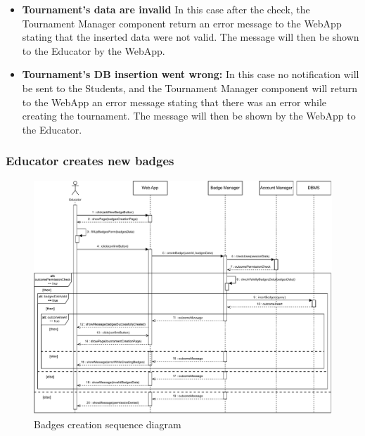 \documentclass{article}
\begin{document}
{\begin{itemize}
            \item \textbf{Tournament's data are invalid} In this case after the check, the 
            Tournament Manager component return an error message to the WebApp stating 
            that the inserted data were not valid. The message will then be shown to the 
            Educator by the WebApp.
            \item \textbf{Tournament's DB insertion went wrong:} In this case no 
            notification will be sent to the Students, and the Tournament Manager component will 
            return to the WebApp an error message stating that there was an error while 
            creating the tournament.
            The message will then be shown by the WebApp to the Educator.
        \end{itemize}

    \subsubsection{Educator creates new badges}
        \begin{figure}[H]
            \centering
            \hspace*{-3.3cm}\includegraphics[scale=0.85]{Sequence/Sequence4DD.pdf}
            \caption{Badges creation sequence diagram}
            \label{fig:Sequence4DD}
        \end{figure}

}
\end{document}
